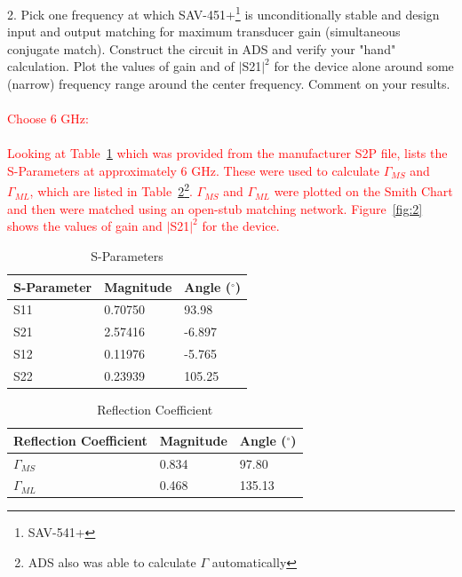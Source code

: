 \documentclass[conference]{IEEEtran}
\begin{document}
2. Pick one frequency at which SAV-451+\footnote{SAV-541+} is unconditionally stable and design input and output matching for maximum transducer gain (simultaneous conjugate match). Construct the circuit in ADS and verify your "hand" calculation. Plot the values of gain and of $|$S21$|^2$ for the device alone around some (narrow) frequency range around the center frequency. Comment on your results.\\\\
\textcolor{red}{Choose 6 GHz:\\\\
Looking at Table~\ref{sparam} which was provided from the manufacturer S2P file, lists the S-Parameters at approximately 6 GHz.  These were used to calculate $\Gamma_{MS}$ and  $\Gamma_{ML}$, which are listed in Table~\ref{refco}\footnote{ADS also was able to calculate $\Gamma$ automatically}.  $\Gamma_{MS}$ and  $\Gamma_{ML}$  were plotted on the Smith Chart and then were matched using an open-stub matching network.  Figure~\ref{fig:2} shows the values of gain and  $|$S21$|^2$ for the device.}

\begin{table}[!h]
    \caption {S-Parameters}
    \begin{tabular}{lll}
    S-Parameter & Magnitude & Angle ($^{\circ}$) \\ \hline
    S11         & 0.70750   & 93.98            \\
    S21         & 2.57416   & -6.897           \\
    S12         & 0.11976   & -5.765           \\
    S22         & 0.23939   & 105.25           \\
    \end{tabular}
\label{sparam}
\end{table}

\begin{table}[h!]
\caption {Reflection Coefficient}
    \begin{tabular}{lll}

    Reflection Coefficient & Magnitude & Angle ($^{\circ}$) \\ \hline
    $\Gamma_{MS}$          & 0.834     & 97.80              \\
    $\Gamma_{ML}$          & 0.468     & 135.13             \\
    \end{tabular}
\label{refco}
\end{table}
\end{document}
